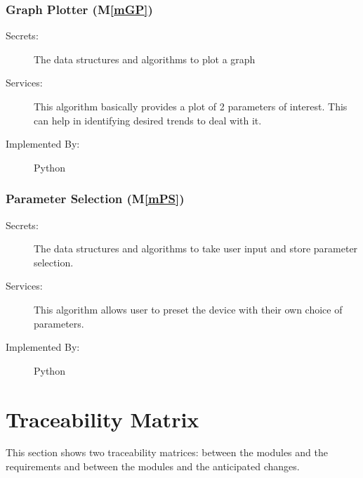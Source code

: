 \documentclass[12pt, titlepage]{article}
\newcommand{\mref}[1]{M\ref{#1}}
\begin{document}
\subsubsection{Graph Plotter (\mref{mGP})}

\begin{description}
  \item[Secrets:] The data structures and algorithms to plot a graph
  \item[Services:] This algorithm basically provides a plot of 2 parameters of interest. This can help in identifying desired trends to deal with it.
  \item[Implemented By:] Python
\end{description}

\subsubsection{Parameter Selection (\mref{mPS})}

\begin{description}
  \item[Secrets:] The data structures and algorithms to take user input and store parameter selection.
  \item[Services:] This algorithm allows user to preset the device with their own choice of parameters.
  \item[Implemented By:] Python
\end{description}

\section{Traceability Matrix} \label{SecTM}

This section shows two traceability matrices: between the modules and the
requirements and between the modules and the anticipated changes.
\end{document}

